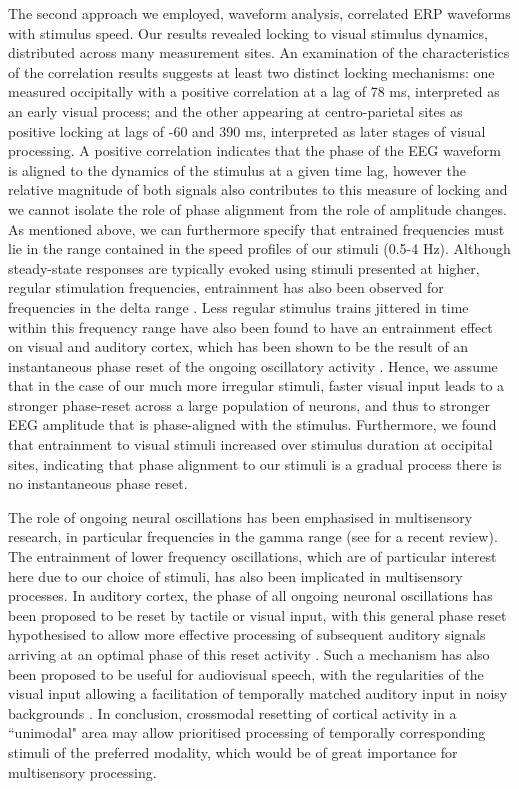 The second approach we employed, waveform analysis, correlated ERP
waveforms with stimulus speed. Our results revealed locking to visual
stimulus dynamics, distributed across many measurement sites. An
examination of the characteristics of the correlation results suggests at
least two distinct locking mechanisms: one measured occipitally with a
positive correlation at a lag of 78 ms, interpreted as an early visual
process; and the other appearing at centro-parietal sites as positive
locking at lags of -60 and 390 ms, interpreted as later stages of visual
processing. A positive correlation indicates that the phase of the EEG
waveform is aligned to the dynamics of the stimulus at a given time lag,
however the relative magnitude of both signals also contributes to this
measure of locking and we cannot isolate the role of phase alignment from
the role of amplitude changes. As mentioned above, we can furthermore
specify that entrained frequencies must lie in the range contained in the
speed profiles of our stimuli (0.5-4 Hz). Although steady-state responses
are typically evoked using stimuli presented at higher, regular stimulation
frequencies, entrainment has also been observed for frequencies in the
delta range \citep{ding2006a}. Less regular stimulus trains jittered in
time within this frequency range have also been found to have an
entrainment effect on visual and auditory cortex, which has been shown to
be the result of an instantaneous phase reset of the ongoing oscillatory
activity \citep{lakatos2008a, lakatos2005a}. Hence, we assume that in the
case of our much more irregular stimuli, faster visual input leads to a
stronger phase-reset across a large population of neurons, and thus to
stronger EEG amplitude that is phase-aligned with the stimulus.
Furthermore, we found that entrainment to visual stimuli increased over
stimulus duration at occipital sites, indicating that phase alignment to
our stimuli is a gradual process \textemdash there is no instantaneous
phase reset.



The role of ongoing neural oscillations has been emphasised in multisensory
research, in particular frequencies in the gamma range (see
\cite{senkowski2008a} for a recent review). The entrainment of lower
frequency oscillations, which are of particular interest here due to our
choice of stimuli, has also been implicated in multisensory processes. In
auditory cortex, the phase of all ongoing neuronal oscillations has been
proposed to be reset by tactile or visual input, with this general phase
reset hypothesised to allow more effective processing of subsequent
auditory signals arriving at an optimal phase of this reset activity
\citep{lakatos2007a, kayser2008a}. Such a mechanism has also been proposed
to be useful for audiovisual speech, with the regularities of the visual
input allowing a facilitation of temporally matched auditory input in noisy
backgrounds \citep{schroeder2008a}. In conclusion, crossmodal resetting of
cortical activity in a ``unimodal" area may allow prioritised processing of
temporally corresponding stimuli of the preferred modality, which would be
of great importance for multisensory processing.



